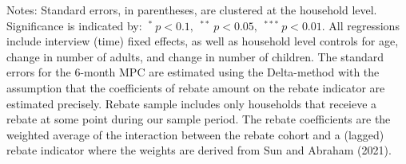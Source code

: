 \begin{table}[!t]
 \begin{minipage}{\hsize} \rule{0pt}{9pt} \footnotesize Notes:  Standard errors, in parentheses, are clustered at the household level. Significance is indicated by: $ \:^{*}\:p<0.1,\:\:^{**}\:p<0.05,\:\:^{***}\:p<0.01 $. All regressions include interview (time) fixed effects, as well as household level controls for age, change in number of adults, and change in number of children. The standard errors for the 6-month MPC are estimated using the Delta-method with the assumption that the coefficients of rebate amount on the rebate indicator are estimated precisely.  Rebate sample includes only households that receieve a rebate at some point during our sample period. The rebate coefficients are the weighted average of the interaction between the rebate cohort and a (lagged) rebate indicator where the weights are derived from Sun and Abraham (2021).    \end{minipage} \label{tab:Table_E2} \end{table}
